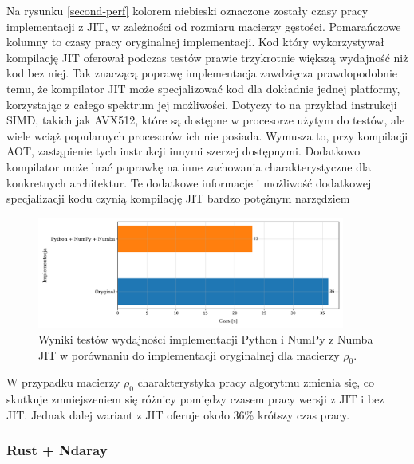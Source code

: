 \documentclass[10pt, a4paper]{article}
\begin{document}
\begin{sloppypar}
    Na rysunku \ref{second-perf} kolorem niebieski oznaczone zostały czasy pracy
    implementacji z JIT, w zależności od rozmiaru macierzy gęstości. Pomarańczowe
    kolumny to czasy pracy oryginalnej implementacji. Kod który wykorzystywał kompilację
    JIT oferował podczas testów prawie trzykrotnie większą wydajność niż kod bez niej.
    Tak znaczącą poprawę implementacja zawdzięcza prawdopodobnie temu, że kompilator JIT
    może specjalizować kod dla dokładnie jednej platformy, korzystając z całego spektrum
    jej możliwości. Dotyczy to na przykład instrukcji SIMD, takich jak AVX512, które są dostępne
    w procesorze użytym do testów, ale wiele wciąż popularnych procesorów ich nie
    posiada. Wymusza to, przy kompilacji AOT, zastąpienie tych instrukcji innymi szerzej
    dostępnymi. Dodatkowo kompilator może brać poprawkę na inne zachowania
    charakterystyczne dla konkretnych architektur. Te dodatkowe informacje i możliwość dodatkowej
    specjalizacji kodu czynią kompilację JIT bardzo potężnym narzędziem

    \FloatBarrier
    \begin{figure}[ht]
      \centering
      \includegraphics[width=0.9\textwidth]{"resources/benchmark_4/plot2.png"}
      \caption{Wyniki testów wydajności implementacji Python i NumPy z Numba JIT w porównaniu do implementacji oryginalnej dla macierzy $\rho
      _{0}$.}
      \label{third-alt-perf}
    \end{figure}
    \FloatBarrier

    W przypadku macierzy $\rho_{0}$ charakterystyka pracy algorytmu zmienia się, co
    skutkuje zmniejszeniem się różnicy pomiędzy czasem pracy wersji z JIT i bez JIT. Jednak
    dalej wariant z JIT oferuje około 36\% krótszy czas pracy.

    \subsubsection{ Rust + Ndaray}



\end{sloppypar}
\end{document}
